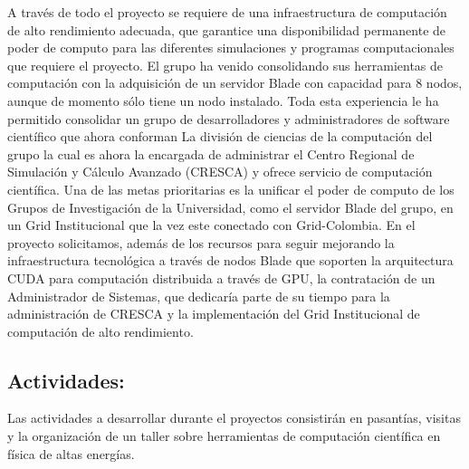 A través de todo el proyecto se requiere de una infraestructura de
computación de alto rendimiento adecuada, que garantice una
disponibilidad permanente de poder de computo para las diferentes
simulaciones y programas computacionales que requiere el proyecto. El
grupo ha venido consolidando sus herramientas de computación con la
adquisición de un servidor Blade con capacidad para 8 nodos, aunque de
momento sólo tiene un nodo instalado. Toda esta experiencia le ha
permitido consolidar un grupo de desarrolladores y administradores de
software científico que ahora conforman La división de ciencias de la
computación del grupo la cual es ahora la encargada de administrar el
Centro Regional de Simulación y Cálculo Avanzado (CRESCA) y ofrece
servicio de computación científica.  Una de las metas prioritarias es
la unificar el poder de computo de los Grupos de Investigación de la
Universidad, como el servidor Blade del grupo, en un Grid
Institucional que la vez este conectado con Grid-Colombia. En el
proyecto solicitamos, además de los recursos para seguir mejorando la
infraestructura tecnológica a través de nodos Blade que soporten la
arquitectura CUDA para computación distribuida a través de GPU, la
contratación de un Administrador de Sistemas, que dedicaría parte de
su tiempo para la administración de CRESCA y la implementación del
Grid Institucional de computación de alto rendimiento.



\subsection{Actividades:                                   }
\label{sec:actividades}
Las actividades a desarrollar durante el proyectos consistirán en
pasantías, visitas y la organización de un taller sobre herramientas de
computación científica en física de altas energías.

